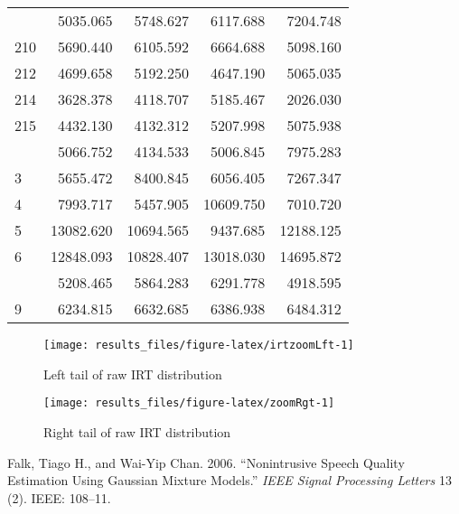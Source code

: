 \documentclass[]{tufte-handout}
\begin{document}
\begin{longtable}{lrrrr}
\addlinespace
21 & 5035.065 & 5748.627 & 6117.688 & 7204.748\\
210 & 5690.440 & 6105.592 & 6664.688 & 5098.160\\
212 & 4699.658 & 5192.250 & 4647.190 & 5065.035\\
214 & 3628.378 & 4118.707 & 5185.467 & 2026.030\\
215 & 4432.130 & 4132.312 & 5207.998 & 5075.938\\
\addlinespace
22 & 5066.752 & 4134.533 & 5006.845 & 7975.283\\
3 & 5655.472 & 8400.845 & 6056.405 & 7267.347\\
4 & 7993.717 & 5457.905 & 10609.750 & 7010.720\\
5 & 13082.620 & 10694.565 & 9437.685 & 12188.125\\
6 & 12848.093 & 10828.407 & 13018.030 & 14695.872\\
\addlinespace
7 & 5208.465 & 5864.283 & 6291.778 & 4918.595\\
9 & 6234.815 & 6632.685 & 6386.938 & 6484.312\\
\bottomrule
\end{longtable}

\begin{figure}
\texttt{[image: results\_files/figure-latex/irtzoomLft-1]} \caption[Left tail of raw IRT distribution]{Left tail of raw IRT distribution}\label{fig:irtzoomLft}
\end{figure}

\begin{figure}
\texttt{[image: results\_files/figure-latex/zoomRgt-1]} \caption[Right tail of raw IRT distribution]{Right tail of raw IRT distribution}\label{fig:zoomRgt}
\end{figure}

\hypertarget{refs}{}
\hypertarget{ref-gmm1}{}
Falk, Tiago H., and Wai-Yip Chan. 2006. ``Nonintrusive Speech Quality
Estimation Using Gaussian Mixture Models.'' \emph{IEEE Signal Processing
Letters} 13 (2). IEEE: 108--11.
\end{document}
